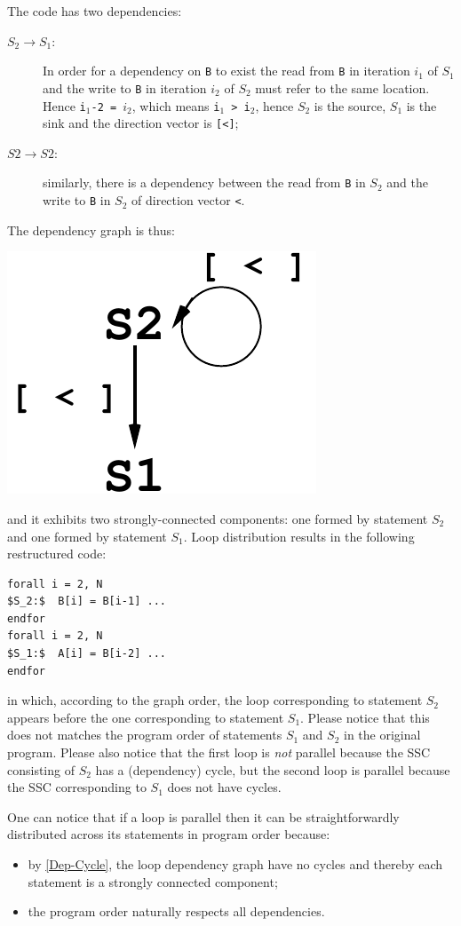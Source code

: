 \documentclass[acmsmall,review]{acmart}\settopmatter{printfolios=true,printccs=false,printacmref=false}
\begin{document}
The code has two dependencies:
\begin{description}
    \item[$S_2\to S_1$:]  In order for a dependency on {\tt B} to exist
        the read from {\tt B} in iteration $i_1$ of $S_1$ and 
        the write to {\tt B} in iteration $i_2$ of $S_2$ must refer
        to the same location. Hence {\tt i$_1$-2 = $i_2$}, which means
        {\tt i$_1$ > i$_2$}, hence $S_2$ is the source, $S_1$ is the
        sink and the direction vector is {\tt[<]};
    \item[$S2\to S2$:] similarly, there is a dependency between the
        read from {\tt B} in $S_2$ and the write to {\tt B} in $S_2$
        of direction vector {\tt<}.   
\end{description}

The dependency graph is thus:

\includegraphics[height=15ex]{Figures/L5/LoopDistr}

\noindent and it exhibits two strongly-connected components:
one formed by statement $S_2$ and one formed by statement $S_1$.
Loop distribution results in the following restructured code:
\begin{lstlisting}[mathescape=true]
forall i = 2, N
$S_2:$  B[i] = B[i-1] ...
endfor
forall i = 2, N
$S_1:$  A[i] = B[i-2] ...
endfor
\end{lstlisting}\vspace{-2ex}
in which, according to the graph order, the loop corresponding to
statement $S_2$ appears before the one corresponding to statement
$S_1$. Please notice that this does not matches the program order 
of statements $S_1$ and $S_2$ in the original program. Please also 
notice that the first loop is {\em not} parallel because the SSC 
consisting of $S_2$ has a (dependency) cycle, but the second loop 
is parallel because the SSC corresponding to $S_1$ does not have 
cycles.

One can notice that if a loop is parallel then it can be straightforwardly
distributed across its statements in program order because:
\begin{itemize}
    \item by \cref{Dep-Cycle}, the loop dependency graph have no
            cycles and thereby each statement is a strongly connected
            component; 
    \item the program order naturally respects all dependencies.
\end{itemize}
\end{document}
